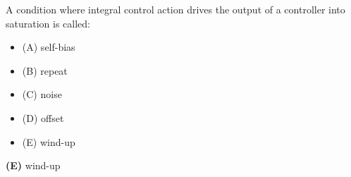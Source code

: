 

A condition where integral control action drives the output of a controller into saturation is called:

\begin{itemize}
\item{(A)} self-bias
\vskip 5pt 
\item{(B)} repeat
\vskip 5pt 
\item{(C)} noise
\vskip 5pt 
\item{(D)} offset
\vskip 5pt 
\item{(E)} wind-up
\end{itemize}







{\bf (E)} wind-up











